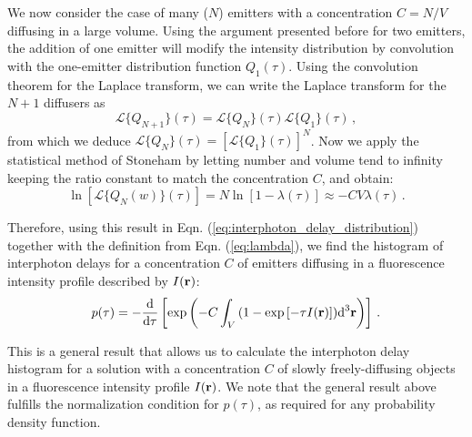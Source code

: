 We now consider the case of many ($N$) emitters with a concentration $C={N}/{V}$
 diffusing in a large volume. Using the argument presented before for two emitters, 
the addition of one emitter will modify the intensity distribution by convolution 
with the one-emitter distribution function $Q_1(\tau)$. Using the convolution theorem 
for the Laplace transform, we can write the Laplace transform for the $N+1$ diffusers as
\begin{equation}
\mathscr{L}\{Q_{N+1}\}(\tau) = \mathscr{L}\{Q_N\}(\tau) \mathscr{L}\{Q_1\}(\tau)\,,
\label{eq:laplace_N}
\end{equation}
from which we deduce 
$\mathscr{L}\{Q_{N}\}(\tau)=\left[\mathscr{L}\{Q_{1}\}(\tau)\right]^N $. 
Now we apply the statistical method of Stoneham \cite{STONEHAM1969, fleury1993} 
by letting number and volume tend to infinity keeping the ratio constant to match 
the concentration $C$, and obtain:
\begin{equation}
\ln\left[\mathscr{L}\{Q_{N}(w)\}(\tau)\right] = 
N\ln\left[1-\lambda(\tau)\right] \approx - C V \lambda(\tau)\,.
\label{eq:stoneham_approx}
\end{equation}

Therefore, using this result in Eqn. (\ref{eq:interphoton_delay_distribution})
together with the definition from Eqn. (\ref{eq:lambda}), we find the histogram of 
interphoton delays for a concentration $C$ of emitters diffusing 
in a fluorescence intensity profile described by $I({\mathbf{r}})$: 
\begin{equation}
p(\tau)=-\frac{\mbox{d}}{\mbox{d}\tau}\left[ 
\exp\left(-C \int_V{\left(1-\exp\left[-\tau I({\mathbf{r}})\right] \right)}
\mbox{d}^3{\mathbf{r}}    \right)\right]\,.
\label{eq:result}
\end{equation}

This is a general result that allows us to calculate the interphoton 
delay histogram  for a solution with a concentration $C$ of slowly 
freely-diffusing objects in a fluorescence intensity profile $I({\mathbf{r}})$. 
We note that the general result above fulfills the normalization condition 
for $p(\tau)$, as required for any probability density function.



